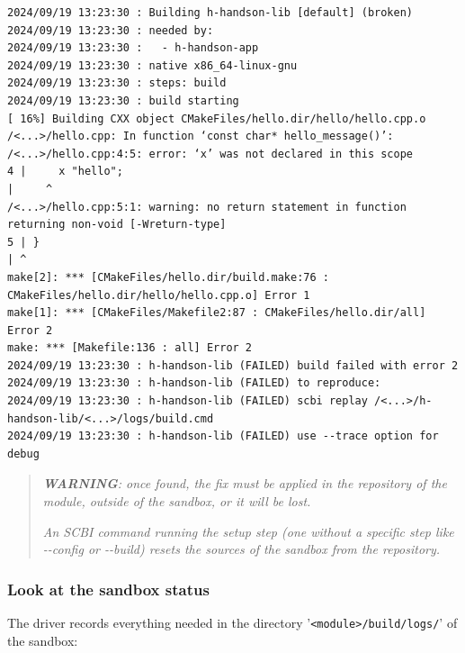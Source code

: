 \documentclass[a4paper,12pt,twoside]{article}
\renewcommand{\emph}[1]{\textit{#1}}
\newcommand{\file}[1]{'{\texttt{#1}}'}
\newcommand{\ddash}{-{}-}
\begin{document}
\begin{footnotesize}
\begin{verbatim}
2024/09/19 13:23:30 : Building h-handson-lib [default] (broken)
2024/09/19 13:23:30 : needed by:
2024/09/19 13:23:30 :   - h-handson-app
2024/09/19 13:23:30 : native x86_64-linux-gnu
2024/09/19 13:23:30 : steps: build
2024/09/19 13:23:30 : build starting
[ 16%] Building CXX object CMakeFiles/hello.dir/hello/hello.cpp.o
/<...>/hello.cpp: In function ‘const char* hello_message()’:
/<...>/hello.cpp:4:5: error: ‘x’ was not declared in this scope
4 |     x "hello";
|     ^
/<...>/hello.cpp:5:1: warning: no return statement in function returning non-void [-Wreturn-type]
5 | }
| ^
make[2]: *** [CMakeFiles/hello.dir/build.make:76 : CMakeFiles/hello.dir/hello/hello.cpp.o] Error 1
make[1]: *** [CMakeFiles/Makefile2:87 : CMakeFiles/hello.dir/all] Error 2
make: *** [Makefile:136 : all] Error 2
2024/09/19 13:23:30 : h-handson-lib (FAILED) build failed with error 2
2024/09/19 13:23:30 : h-handson-lib (FAILED) to reproduce:
2024/09/19 13:23:30 : h-handson-lib (FAILED) scbi replay /<...>/h-handson-lib/<...>/logs/build.cmd
2024/09/19 13:23:30 : h-handson-lib (FAILED) use --trace option for debug
\end{verbatim}
\end{footnotesize}

\begin{quote}
	\emph{\textbf{WARNING}: once found, the fix must be applied in the repository of the module, outside of the sandbox, or it will be lost.}

	\emph{An SCBI command running the setup step (one without a specific step like \ddash{}config or \ddash{}build) resets the sources of the sandbox from the repository.}
\end{quote}

\subsubsection{Look at the sandbox status}

The driver records everything needed in the directory \file{<module>/build/logs/} of the sandbox:
\end{document}
